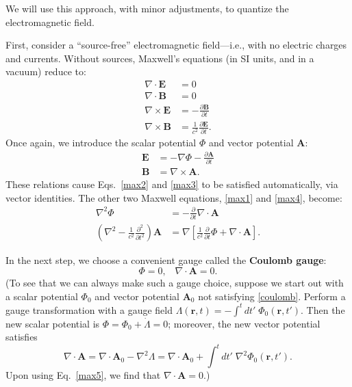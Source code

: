 \documentclass[pra,12pt]{revtex4}
\begin{document}
We will use this approach, with minor adjustments, to quantize the
electromagnetic field.

First, consider a ``source-free'' electromagnetic field---i.e., with
no electric charges and currents.  Without sources, Maxwell's
equations (in SI units, and in a vacuum) reduce to:
\begin{align}
  \nabla\cdot \mathbf{E} &= 0 \label{max1} \\
  \nabla\cdot \mathbf{B} &= 0 \label{max2}\\
  \nabla\times \mathbf{E} &= -\frac{\partial \mathbf{B}}{\partial t} \label{max3}\\
  \nabla\times \mathbf{B} &= \frac{1}{c^2} \frac{\partial \mathbf{E}}{\partial t}.
  \label{max4}
\end{align}
Once again, we introduce the scalar potential $\Phi$ and vector
potential $\mathbf{A}$:
\begin{align}
  \mathbf{E} &= - \nabla \Phi - \frac{\partial\mathbf{A}}{\partial t} \\
  \mathbf{B} &= \nabla \times \mathbf{A}.
\end{align}
These relations cause Eqs.~\eqref{max2} and \eqref{max3} to be
satisfied automatically, via vector identities.  The other two Maxwell
equations, \eqref{max1} and \eqref{max4}, become:
\begin{align}
  \nabla^2 \Phi &= -\frac{\partial}{\partial t} \nabla \cdot \mathbf{A} \label{max5} \\
  \left(\nabla^2 - \frac{1}{c^2}\frac{\partial^2}{\partial t^2}\right)
  \mathbf{A} &= \nabla\left[\frac{1}{c^2}\frac{\partial}{\partial t}  \Phi + \nabla\cdot\mathbf{A}\right]. \label{max6}
\end{align}

In the next step, we choose a convenient gauge called the
\textbf{Coulomb gauge}:
\begin{equation}
  \Phi = 0, \;\;\; \nabla \cdot \mathbf{A} = 0.
  \label{coulomb}
\end{equation}
(To see that we can always make such a gauge choice, suppose we start
out with a scalar potential $\Phi_0$ and vector potential
$\mathbf{A}_0$ not satisfying \eqref{coulomb}.  Perform a gauge
transformation with a gauge field $\Lambda(\mathbf{r}, t) = - \int^t
dt'\; \Phi_0(\mathbf{r}, t')$.  Then the new scalar potential is $\Phi
= \Phi_0 + \dot{\Lambda} = 0$; moreover, the new vector potential
satisfies
\begin{equation}
  \nabla\cdot\mathbf{A} = \nabla\cdot \mathbf{A}_0 - \nabla^2 \Lambda
  = \nabla\cdot \mathbf{A}_0 + \int^t dt'\; \nabla^2\Phi_0(\mathbf{r}, t').
\end{equation}
Upon using Eq.~\eqref{max5}, we find that $\nabla\cdot\mathbf{A} =
0$.)
\end{document}
